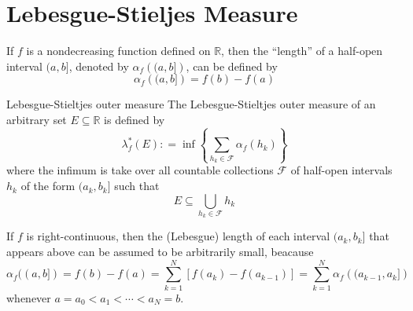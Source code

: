 \documentclass[../main.tex]{subfiles}
\begin{document}
\section{Lebesgue-Stieljes Measure}

\begin{definition}{}{}
    If \(  f  \) is a nondecreasing function defined on \(  \mathbb{R}   \), then the ``length'' of a half-open interval \(  (a,b]  \), denoted by \(  \alpha _{f}\left( (a,b] \right)   \), can be defined by \[
     \alpha _{f}\left( (a,b] \right)= f\left( b \right)-f\left( a \right)   
    \]    
\end{definition}

\begin{definition}{Lebesgue-Stieltjes outer measure}{}
    The Lebesgue-Stieltjes outer measure of an arbitrary set \(  E\subseteq \mathbb{R}   \) is defined by \[
     \lambda _{f}^{*}\left( E \right): = \inf \left\{ \sum _{h_{k}\in \mathcal{F}}\alpha _{f}\left( h_{k} \right)  \right\} 
    \] where the infimum is take over all countable collections \(  \mathcal{F}  \) of half-open intervals \(  h_{k}  \) of the form \(  (a_{k},b_{k}]  \) such that \[
    E\subseteq \bigcup _{ h _{k}\in \mathcal{F}}h_{k}
    \]   
\end{definition}

\begin{remark}
    If \(  f  \) is right-continuous, then the (Lebesgue) length of each interval \(  (a_{k},b_{k}]  \) that appears above can be assumed to be arbitrarily small, beacause \[
    \alpha _{f}((a,b])= f\left( b \right)-f\left( a \right)= \sum _{k = 1}^{N}\left[ f\left( a_{k} \right)-f\left( a_{k-1} \right)   \right]= \sum _{k = 1}^{N} \alpha _{f}\left( (a_{k-1},a_{k}] \right)    
    \] whenever \(  a= a_0< a_1< \cdots < a_{N}= b  \).  
\end{remark}
\end{document}
